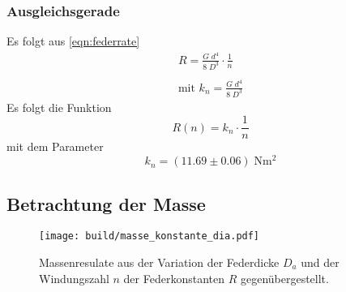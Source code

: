 \subsubsection{Ausgleichsgerade}

Es folgt aus \ref{eqn:federrate}
\begin{align*}
  R=\frac{G\;d^4}{8\;D^3}\cdot \frac{1}{n} \\\\  
  \text{mit } k_n=\frac{G\;d^4}{8\;D^3}
\end{align*}
Es folgt die Funktion
\begin{equation*}
  R(n)=k_n \cdot \frac{1}{n}
\end{equation*}
mit dem Parameter
\begin{equation*}
  k_n=(11.69 \pm 0.06) \;\si{\N\meter\squared}
\end{equation*}


\subsection{Betrachtung der Masse}
\begin{figure}[H]
  \center
  \texttt{[image: build/masse\_konstante\_dia.pdf]}
  \caption{Massenresulate aus der Variation der Federdicke $D_a$
          und der Windungszahl $n$ der Federkonstanten $R$ gegenübergestellt. }
\end{figure}



\label{sec:Auswertung}

